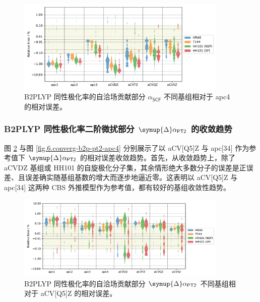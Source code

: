 \begin{figure}[!ht]
    \centering
    \includegraphics[width=0.9\textwidth]{assets/converg-b2p-scf-apc4.pdf}
    \caption[B2PLYP $\alpha_\textsf{SCF}$ 不同基组相对于 apc4 的相对误差]{B2PLYP 同性极化率的自洽场贡献部分 $\alpha_\textsf{SCF}$ 不同基组相对于 apc4 的相对误差。}
    \label{fig.6.converg-b2p-scf-apc4}
\end{figure}

\subsubsection{B2PLYP 同性极化率二阶微扰部分 $\symup{\Delta} \alpha_\textsf{PT2}$ 的收敛趋势}

图 \ref{fig.6.converg-b2p-pt2-aCV5Z} 与图 \ref{fig.6.converg-b2p-pt2-apc4} 分别展示了以 aCV[Q5]Z 与 apc[34] 作为参考值下 $\symup{\Delta} \alpha_\textsf{PT2}$ 的相对误差收敛趋势。首先，从收敛趋势上，除了 aCVDZ 基组或 HH101 的自旋极化分子集，其余情形绝大多数分子的误差是正误差、且误差确实随基组基数的增大而逐步地逼近零。这表明以 aCV[Q5]Z 与 apc[34] 这两种 CBS 外推模型作为参考值，都有较好的基组收敛性趋势。

\begin{figure}[!ht]
    \centering
    \includegraphics[width=0.9\textwidth]{assets/converg-b2p-pt2-aCV5Z.pdf}
    \caption[B2PLYP $\symup{\Delta} \alpha_\textsf{PT2}$ 不同基组相对于 aCV\text{[Q5]}Z 的相对误差]{B2PLYP 同性极化率的自洽场贡献部分 $\symup{\Delta} \alpha_\textsf{PT2}$ 不同基组相对于 aCV[Q5]Z 的相对误差。}
    \label{fig.6.converg-b2p-pt2-aCV5Z}
\end{figure}

